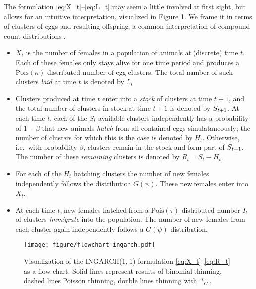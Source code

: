 \documentclass[review]{elsarticle}
\begin{document}
The formulation \eqref{eq:X_t}--\eqref{eq:L_t} may seem a little involved at first sight, but allows for an intuitive interpretation, visualized in Figure \ref{fig:ingarch_flowchart}. We frame it in terms of clusters of eggs and resulting offspring, a common interpretation of compound count distributions \cite{Neyman1939}.
\begin{itemize}
\item $X_t$ is the number of females in a population of animals at (discrete) time $t$. Each of these females only stays alive for one time period and produces
 a $\text{Pois}(\kappa)$ distributed number of egg clusters. The total number of such clusters \textit{laid} at time $t$ is denoted by $L_t$.
\item Clusters produced at time $t$ enter into a \textit{stock} of clusters at time $t + 1$, and the total number of clusters in stock at time $t + 1$ is denoted by $S_{t + 1}$. At each time $t$, each of the $S_t$ available clusters independently has a probability of $1 - \beta$ that new animals \textit{hatch} from all contained eggs simulataneously; the number of clusters for which this is the case is denoted by $H_t$. Otherwise, i.e.\ with probability $\beta$, clusters remain in the stock and form part of $S_{t + 1}$. The number of these \textit{remaining} clusters is denoted by $R_t = S_t - H_t$.
\item For each of the $H_t$ hatching clusters the number of new females independently follows the distribution $G(\psi)$. These new females enter into $X_t$.
\item At each time $t$, new females hatched from a $\text{Pois}(\tau)$ distributed number $I_t$ of clusters \textit{immigrate} into the population. The number of new females from each cluster again independently follows a $G(\psi)$ distribution.
\end{itemize}

\begin{figure}[h!]
\texttt{[image: figure/flowchart\_ingarch.pdf]}
\caption{Visualization of the INGARCH(1, 1) formulation \eqref{eq:X_t}--\eqref{eq:R_t}  as a flow chart. Solid lines represent results of binomial thinning, dashed lines Poisson thinning, double lines thinning with $*_G$.}
\label{fig:ingarch_flowchart}
\end{figure}

\end{document}
